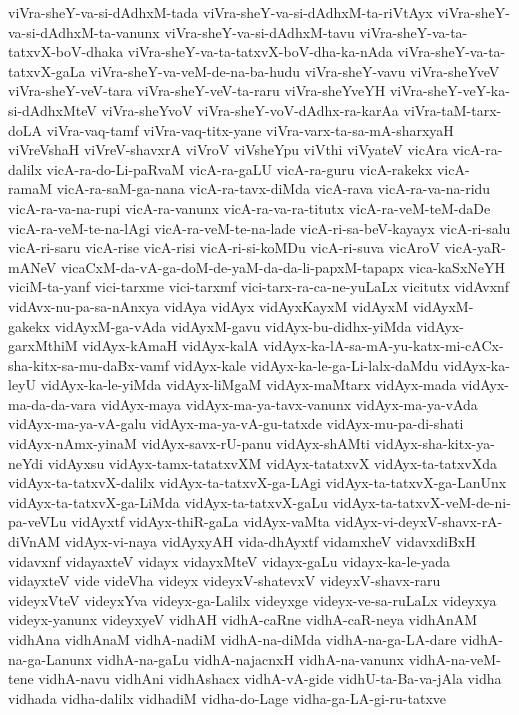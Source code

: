 {viVra-sheY-va-si-dAdhxM-tada
viVra-sheY-va-si-dAdhxM-ta-riVtAyx
viVra-sheY-va-si-dAdhxM-ta-vanunx
viVra-sheY-va-si-dAdhxM-tavu
viVra-sheY-va-ta-tatxvX-boV-dhaka
viVra-sheY-va-ta-tatxvX-boV-dha-ka-nAda
viVra-sheY-va-ta-tatxvX-gaLa
viVra-sheY-va-veM-de-na-ba-hudu
viVra-sheY-vavu
viVra-sheYveV
viVra-sheY-veV-tara
viVra-sheY-veV-ta-raru
viVra-sheYveYH
viVra-sheY-veY-ka-si-dAdhxMteV
viVra-sheYvoV
viVra-sheY-voV-dAdhx-ra-karAa
viVra-taM-tarx-doLA
viVra-vaq-tamf
viVra-vaq-titx-yane
viVra-varx-ta-sa-mA-sharxyaH
viVreVshaH
viVreV-shavxrA
viVroV
viVsheYpu
viVthi
viVyateV
vicAra
vicA-ra-dalilx
vicA-ra-do-Li-paRvaM
vicA-ra-gaLU
vicA-ra-guru
vicA-rakekx
vicA-ramaM
vicA-ra-saM-ga-nana
vicA-ra-tavx-diMda
vicA-rava
vicA-ra-va-na-ridu
vicA-ra-va-na-rupi
vicA-ra-vanunx
vicA-ra-va-ra-titutx
vicA-ra-veM-teM-daDe
vicA-ra-veM-te-na-lAgi
vicA-ra-veM-te-na-lade
vicA-ri-sa-beV-kayayx
vicA-ri-salu
vicA-ri-saru
vicA-rise
vicA-risi
vicA-ri-si-koMDu
vicA-ri-suva
vicAroV
vicA-yaR-mANeV
vicaCxM-da-vA-ga-doM-de-yaM-da-da-li-papxM-tapapx
vica-kaSxNeYH
viciM-ta-yanf
vici-tarxme
vici-tarxmf
vici-tarx-ra-ca-ne-yuLaLx
vicitutx
vidAvxnf
vidAvx-nu-pa-sa-nAnxya
vidAya
vidAyx
vidAyxKayxM
vidAyxM
vidAyxM-gakekx
vidAyxM-ga-vAda
vidAyxM-gavu
vidAyx-bu-didhx-yiMda
vidAyx-garxMthiM
vidAyx-kAmaH
vidAyx-kalA
vidAyx-ka-lA-sa-mA-yu-katx-mi-cACx-sha-kitx-sa-mu-daBx-vamf
vidAyx-kale
vidAyx-ka-le-ga-Li-lalx-daMdu
vidAyx-ka-leyU
vidAyx-ka-le-yiMda
vidAyx-liMgaM
vidAyx-maMtarx
vidAyx-mada
vidAyx-ma-da-da-vara
vidAyx-maya
vidAyx-ma-ya-tavx-vanunx
vidAyx-ma-ya-vAda
vidAyx-ma-ya-vA-galu
vidAyx-ma-ya-vA-gu-tatxde
vidAyx-mu-pa-di-shati
vidAyx-nAmx-yinaM
vidAyx-savx-rU-panu
vidAyx-shAMti
vidAyx-sha-kitx-ya-neYdi
vidAyxsu
vidAyx-tamx-tatatxvXM
vidAyx-tatatxvX
vidAyx-ta-tatxvXda
vidAyx-ta-tatxvX-dalilx
vidAyx-ta-tatxvX-ga-LAgi
vidAyx-ta-tatxvX-ga-LanUnx
vidAyx-ta-tatxvX-ga-LiMda
vidAyx-ta-tatxvX-gaLu
vidAyx-ta-tatxvX-veM-de-ni-pa-veVLu
vidAyxtf
vidAyx-thiR-gaLa
vidAyx-vaMta
vidAyx-vi-deyxV-shavx-rA-diVnAM
vidAyx-vi-naya
vidAyxyAH
vida-dhAyxtf
vidamxheV
vidavxdiBxH
vidavxnf
vidayaxteV
vidayx
vidayxMteV
vidayx-gaLu
vidayx-ka-le-yada
vidayxteV
vide
videVha
videyx
videyxV-shatevxV
videyxV-shavx-raru
videyxVteV
videyxYva
videyx-ga-Lalilx
videyxge
videyx-ve-sa-ruLaLx
videyxya
videyx-yanunx
videyxyeV
vidhAH
vidhA-caRne
vidhA-caR-neya
vidhAnAM
vidhAna
vidhAnaM
vidhA-nadiM
vidhA-na-diMda
vidhA-na-ga-LA-dare
vidhA-na-ga-Lanunx
vidhA-na-gaLu
vidhA-najacnxH
vidhA-na-vanunx
vidhA-na-veM-tene
vidhA-navu
vidhAni
vidhAshacx
vidhA-vA-gide
vidhU-ta-Ba-va-jAla
vidha
vidhada
vidha-dalilx
vidhadiM
vidha-do-Lage
vidha-ga-LA-gi-ru-tatxve
}
